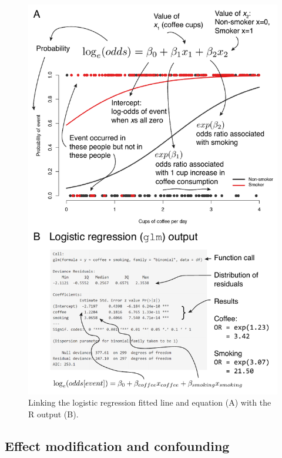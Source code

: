 \documentclass[
  12pt,
  krantz2]{krantz}
\begin{document}
\begin{figure}
\centering
\includegraphics{images/chapter09/4_equation.pdf}
\caption{\label{fig:chap09-fig-equation}Linking the logistic regression fitted line and equation (A) with the R output (B).}
\end{figure}

\hypertarget{effect-modification-and-confounding}{%
\subsection{Effect modification and confounding}\label{effect-modification-and-confounding}}

\end{document}

